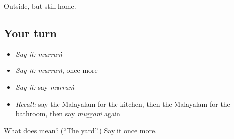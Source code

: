 \begin{grammarlens}[title={What you've built}]
Outside, but still home.
\end{grammarlens}

\subsection*{Your turn}
\begin{itemize}
\raggedright
  \item \emph{Say it:} \emph{muṟṟaṁ}
  \item \emph{Say it:} \emph{muṟṟaṁ}, once more
  \item \emph{Say it:} say \emph{muṟṟaṁ}
  \item \emph{Recall:} say the Malayalam for the kitchen, then the Malayalam for the bathroom, then say \emph{muṟṟaṁ} again
\end{itemize}

\begin{tcolorbox}[breakable,colback=teal!4,colframe=teal!35!black,title={Before you move on}]
What does  mean? (\textquotedblleft{}The yard\textquotedblright{}.) Say it once more.
\end{tcolorbox}
